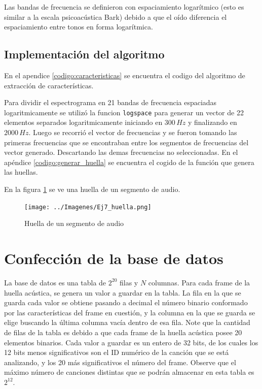 \documentclass[10pt,spanish,a4paper,openany,notitlepage]{article}
\begin{document}
Las bandas de frecuencia se definieron con espaciamiento logarítmico (esto es similar a la escala
psicoacústica Bark) debido a que el oído diferencia el espaciamiento entre tonos en forma
logarítmica.

\subsection{Implementación del algoritmo}

En el apendice \ref{codigo:caracteristicas} se encuentra el codigo
del algoritmo de extracción de características.

Para dividir el espectrograma en 21 bandas de frecuencia espaciadas
logaritmicamente se utilizó la funcion \texttt{logspace} para generar
un vector de 22 elementos separados logaritmicamente iniciando en $300\, \unit{Hz}$
y finalizando en $2000\, \unit{Hz}$.
Luego se recorrió el vector de frecuencias y se fueron tomando las primeras
frecuencias que se encontraban entre los segmentos de frecuencias del vector
generado. Descartando las demas frecuencias no seleccionadas.
En el apéndice \ref{codigo:generar_huella} se encuentra el cogido de la
función que genera las huellas.

En la figura \ref{fig:huella} se ve una huella de un segmento de audio.

\begin{figure}[H] %
\begin{center}
\texttt{[image: ../Imagenes/Ej7\_huella.png]}
\caption{Huella de un segmento de audio}
 \label{fig:huella}
\end{center}
\end{figure}


\section{Confección de la base de datos}

La base de datos es una tabla de $2^{20}$ filas y $N$ columnas. Para cada frame de la huella
acústica, se genera un valor a guardar en la tabla. La fila en la que se guarda cada valor se
obtiene pasando a decimal el número binario conformado por las características del frame
en cuestión, y la columna en la que se guarda se elige buscando la última columna vacía
dentro de esa fila. Note que la cantidad de filas de la tabla es debido a que cada frame de la
huella acústica posee 20 elementos binarios.
Cada valor a guardar es un entero de 32 bits, de los cuales los 12 bits menos significativos
son el ID numérico de la canción que se está analizando, y los 20 más significativos el
número del frame. Observe que el máximo número de canciones distintas que se podrán
almacenar en esta tabla es $2^{12}$.
\end{document}
